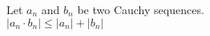 \documentclass[preview]{standalone}
\begin{document}
\begin{center}
Let $a_n$ and $b_n$ be two Cauchy sequences.\\$|a_n \cdot b_n| \leq |a_n| + |b_n|$
\end{center}
\end{document}
